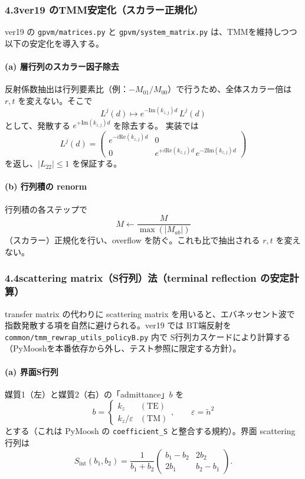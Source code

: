 \documentclass[a4paper,11pt]{jsarticle} %
\begin{document}
\subsubsection*{4.3\;ver19 のTMM安定化（スカラー正規化）}
ver19 の \texttt{gpvm/matrices.py} と \texttt{gpvm/system\_matrix.py} は、TMMを維持しつつ以下の安定化を導入する。

\paragraph{(a) 層行列のスカラー因子除去}
反射係数抽出は行列要素比（例：$-M_{01}/M_{00}$）で行うため、全体スカラー倍は $r,t$ を変えない。そこで
\[
L^j(d)\mapsto e^{-\mathrm{Im}(k_{z,j})d}\,L^j(d)
\]
として、発散する $e^{+\mathrm{Im}(k_{z,j})d}$ を除去する。
実装では
\[
L^j(d)=
\begin{pmatrix}
e^{-i\mathrm{Re}(k_{z,j})d} & 0\\
0 & e^{+i\mathrm{Re}(k_{z,j})d}\,e^{-2\mathrm{Im}(k_{z,j})d}
\end{pmatrix}
\]
を返し、$|L_{22}|\le 1$ を保証する。

\paragraph{(b) 行列積の renorm}
行列積の各ステップで
\[
M \leftarrow \frac{M}{\max(|M_{ab}|)}
\]
（スカラー）正規化を行い、overflow を防ぐ。これも比で抽出される $r,t$ を変えない。

\subsubsection*{4.4\;scattering matrix（S行列）法（terminal reflection の安定計算）}
transfer matrix の代わりに scattering matrix を用いると、エバネッセント波で指数発散する項を自然に避けられる。ver19 では BT端反射を \texttt{common/tmm\_rewrap\_utils\_policyB.py} 内で S行列カスケードにより計算する（PyMooshを本番依存から外し、テスト参照に限定する方針）。

\paragraph{(a) 界面S行列}
媒質1（左）と媒質2（右）の「admittance」$b$ を
\[
b=
\begin{cases}
k_z & (\mathrm{TE})\\
k_z/\varepsilon & (\mathrm{TM})
\end{cases}
,\qquad \varepsilon=\tilde n^2
\]
とする（これは PyMoosh の \texttt{coefficient\_S} と整合する規約）。界面 scattering 行列は
\[
S_{\mathrm{int}}(b_1,b_2)=\frac{1}{b_1+b_2}
\begin{pmatrix}
b_1-b_2 & 2b_2\\
2b_1 & b_2-b_1
\end{pmatrix}.
\]
\end{document}

